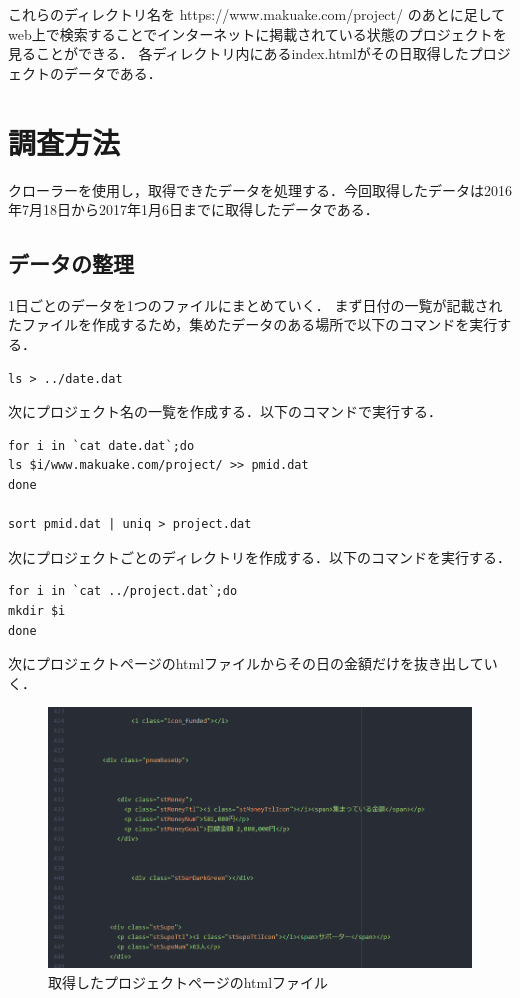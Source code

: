 これらのディレクトリ名を https://www.makuake.com/project/ のあとに足してweb上で検索することでインターネットに掲載されている状態のプロジェクトを見ることができる．
各ディレクトリ内にあるindex.htmlがその日取得したプロジェクトのデータである．
\newpage

\section{調査方法}
クローラーを使用し，取得できたデータを処理する．今回取得したデータは2016年7月18日から2017年1月6日までに取得したデータである．



\subsection{データの整理}
1日ごとのデータを1つのファイルにまとめていく．
まず日付の一覧が記載されたファイルを作成するため，集めたデータのある場所で以下のコマンドを実行する．

\begin{verbatim}
ls > ../date.dat
\end{verbatim}



次にプロジェクト名の一覧を作成する．以下のコマンドで実行する．


\begin{verbatim}
for i in `cat date.dat`;do
ls $i/www.makuake.com/project/ >> pmid.dat
done

sort pmid.dat | uniq > project.dat
\end{verbatim}



次にプロジェクトごとのディレクトリを作成する．以下のコマンドを実行する．

\begin{verbatim}
for i in `cat ../project.dat`;do
mkdir $i
done
\end{verbatim}

\newpage
次にプロジェクトページのhtmlファイルからその日の金額だけを抜き出していく．

\begin{figure}[H]
\centering
\includegraphics[width=16cm]{P1.PNG}
\caption{取得したプロジェクトページのhtmlファイル}\label{サンプル図}
\end{figure}

